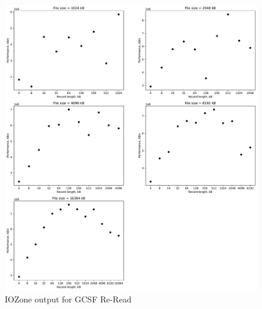\begin{figure}[!htb]
	\label{fig:app_bencgcsffs_re_read}
	\begin{center}
		\includegraphics[width=1.0\textwidth]{figures/benchmarking/gcsf/Re-Read.pdf}
	\end{center}
	\caption{IOZone output for GCSF \mbox{Re-Read}}
\end{figure}

